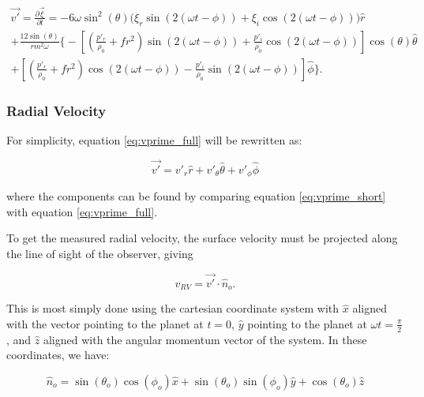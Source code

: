 \documentclass[11pt]{amsart}
\begin{document}
\begin{multline} \label{eq:vprime_full}
\vec{v'} = \frac{\partial \vec{\xi}}{\partial t} =    - 6 \omega \sin^{2}(\theta) \Big(  \xi_{r} \sin \left( 2 ( \omega t - \phi) \right)  + \xi_{i} \cos \left( 2 ( \omega t - \phi) \right) \Big) \hat{r} \\
+ \frac{12 \sin(\theta)}{r m^{2} \omega}  \Bigg\{  - \left[ \left(   \frac{p'_{r}}{\rho_{0}}  +  f r^{2} \right) \sin(2( \omega t - \phi ))  + \frac{p'_{i}}{\rho_{0}} \cos (2( \omega t - \phi )) \right]  \cos(\theta) \hat{\theta}  \\
+  \left[ \left(   \frac{p'_{r}}{\rho_{0}}  +  f r^{2} \right) \cos (2( \omega t - \phi )) - \frac{p'_{i}}{\rho_{0}} \sin(2( \omega t - \phi )) \right] \hat{\phi}    \Bigg\}.
\end{multline}


\subsubsection{Radial Velocity} \label{RV:Implementation:RV}

For simplicity, equation \ref{eq:vprime_full} will be rewritten as:

\begin{equation} \label{eq:vprime_short}
\vec{v'} = v'_{r} \hat{r} + v'_{\theta} \hat{\theta} + v'_{\phi} \hat{\phi}
\end{equation}

where the components can be found by comparing equation \ref{eq:vprime_short} with equation \ref{eq:vprime_full}.

To get the measured radial velocity, the surface velocity must be projected along the line of sight of the observer, giving

\begin{equation}
v_{RV} = \vec{v'} \cdot \hat{n}_{o}.
\end{equation}

This is most simply done using the cartesian coordinate system with $\hat{x}$ aligned with the vector pointing to the planet at $t = 0$, $\hat{y}$ pointing to the planet at $\omega t = \frac{\pi}{2}$, and $\hat{z}$ aligned with the angular momentum vector of the system.  In these coordinates, we have:

\begin{equation}
\hat{n}_{o} = \sin(\theta_{o}) \cos(\phi_{o}) \hat{x} + \sin(\theta_{o}) \sin(\phi_{o}) \hat{y} + \cos(\theta_{o}) \hat{z}
\end{equation}
\end{document}
